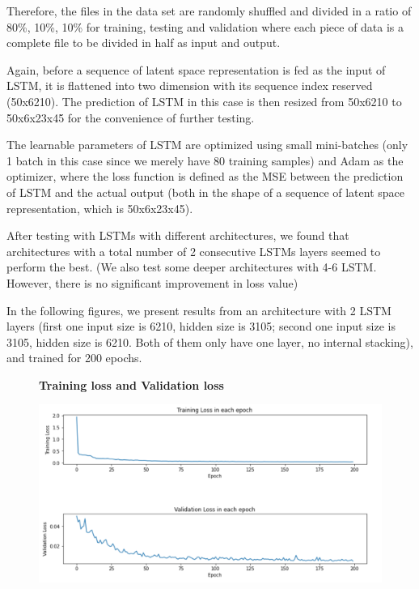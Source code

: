 Therefore, the files in the data set are randomly shuffled and divided in a ratio of 80\%, 10\%, 10\% for training, testing and validation where each piece of data is a complete file to be divided in half as input and output.

Again, before a sequence of latent space representation is fed as the input of LSTM, it is flattened into two dimension with its sequence index reserved (50x6210). The prediction of LSTM in this case is then resized from 50x6210 to 50x6x23x45 for the convenience of further testing.

The learnable parameters of LSTM are optimized using small mini-batches (only 1 batch in this case since we merely have 80 training samples) and Adam as the optimizer, where the loss function is defined as the MSE between the prediction of LSTM and the actual output (both in the shape of a sequence of latent space representation, which is 50x6x23x45).

After testing with LSTMs with different architectures, we found that architectures with a total number of 2 consecutive LSTMs layers seemed to perform the best. (We also test some deeper architectures with 4-6 LSTM. However, there is no significant improvement in loss value)

In the following figures, we present results from an architecture with 2 LSTM layers (first one input size is 6210, hidden size is 3105; second one input size is 3105, hidden size is 6210. Both of them only have one layer, no internal stacking), and trained for 200 epochs.

\begin{figure}[H]
    \textbf{Training loss and Validation loss}\par\medskip
    \includegraphics[scale=0.6]{Report LaTeX/figures/mantle_convection_images/LSTM_trainingData.png}
\end{figure}

